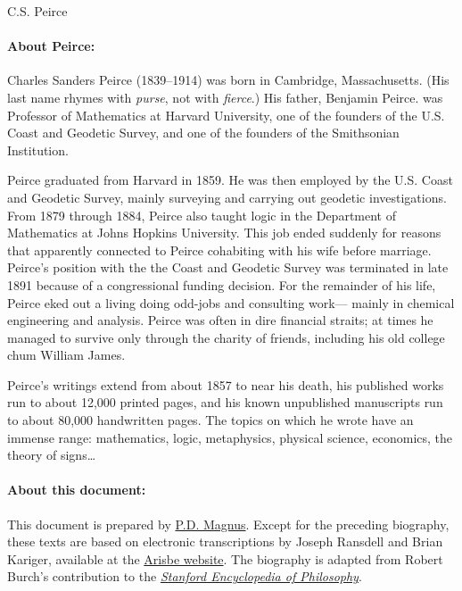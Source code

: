 \documentclass[]{article}
\newcommand*{\authortitle}[1]{\centerline{\Huge\sc #1}}
\begin{document}
\authortitle{C.S. Peirce}

\bigskip


\paragraph{About Peirce:}
Charles Sanders Peirce (1839--1914) was born in Cambridge,
Massachusetts. (His last name rhymes with \emph{purse}, not with \emph{fierce}.) His father, Benjamin Peirce. was Professor of Mathematics at
Harvard University, one of the founders of the U.S. Coast and
Geodetic Survey, and one of the founders of the Smithsonian
Institution.

Peirce graduated from Harvard in 1859. He was then
employed by the U.S. Coast and Geodetic Survey, mainly surveying and
carrying out geodetic investigations. From 1879 through 1884, Peirce
also taught logic in the Department of Mathematics at Johns Hopkins University. This job ended suddenly for reasons that
apparently connected to Peirce cohabiting with his wife before marriage. Peirce's position with the the Coast and Geodetic Survey was
terminated in late 1891 because of a congressional funding decision. For the remainder of his life, Peirce eked out a living doing odd-jobs and consulting work--- mainly in chemical engineering and analysis. Peirce was often in dire financial straits; at times he managed to survive only through the charity of friends, including his old college chum William James.

Peirce's writings extend from about 1857 to near his
death, his published works run to about 12,000 printed pages, and his known unpublished manuscripts run to about 80,000 handwritten pages. The topics on which he wrote have an immense range: mathematics, logic, metaphysics, physical science, economics, the theory of signs\ldots

\paragraph{About this document:}
This document is prepared by \href{https://www.fecundity.com}{P.D. Magnus}. Except for the preceding biography, these texts are based on electronic transcriptions by Joseph Ransdell and Brian Kariger, available at the \href{http://www.iupui.edu/~arisbe/}{Arisbe website}. The biography is adapted from Robert Burch's contribution to the \href{http://plato.stanford.edu}{\emph{Stanford Encyclopedia of Philosophy}}.
\end{document}
